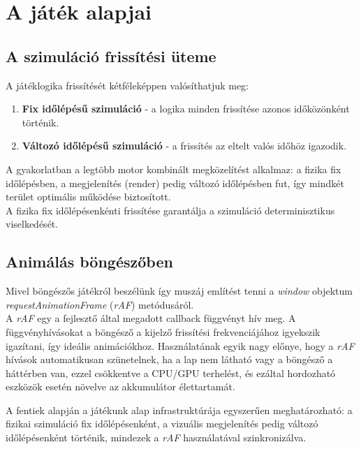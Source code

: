 \documentclass[12pt]{report}
\begin{document}
\section{A játék alapjai}

\subsection{A szimuláció frissítési üteme}

A játéklogika frissítését kétféleképpen valósíthatjuk meg:

\begin{enumerate}
    \item \textbf{Fix időlépésű szimuláció} - a logika minden frissítése azonos időközönként történik.
    \item \textbf{Változó időlépésű szimuláció} - a frissítés az eltelt valós időhöz igazodik.
\end{enumerate}

A gyakorlatban a legtöbb motor kombinált megközelítést alkalmaz: a fizika fix időlépésben, a megjelenítés (render) pedig változó időlépésben fut, így mindkét terület optimális működése biztosított.\\
A fizika fix időlépésenkénti frissítése garantálja a szimuláció determinisztikus viselkedését.

\subsection{Animálás böngészőben}

Mivel böngészős játékról beszélünk így muszáj említést tenni a \textit{window} objektum \textit{requestAnimationFrame} (\textit{rAF}) metódusáról.\\
A \textit{rAF} egy a fejlesztő által megadott callback függvényt hív meg. A függvényhívásokat a böngésző a kijelző frissítési frekvenciájához igyekszik igazítani, így ideális animációkhoz. Használatának egyik nagy előnye, hogy a \textit{rAF} hívások automatikusan szünetelnek, ha a lap nem látható vagy a böngésző a háttérben van, ezzel csökkentve a CPU/GPU terhelést, és ezáltal hordozható eszközök esetén növelve az akkumulátor élettartamát.

A fentiek alapján a játékunk alap infrastruktúrája egyszerűen meghatározható: a fizikai szimuláció fix időlépésenként, a vizuális megjelenítés pedig változó időlépésenként történik, mindezek a \textit{rAF} használatával szinkronizálva.

\newpage
\end{document}
